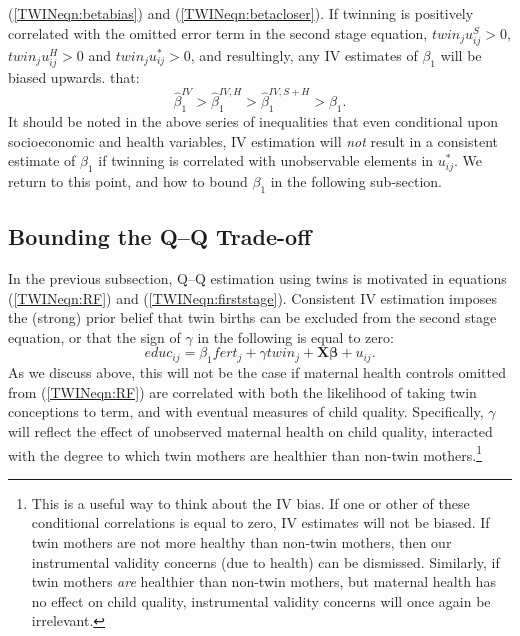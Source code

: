 \documentclass[subeqn]{article}
\begin{document}
\begin{spacing}{1.4}
{(\ref{TWINeqn:betabias}) and (\ref{TWINeqn:betacloser}). If twinning is 
positively correlated with the omitted error term in the second stage equation, 
$twin_ju_{ij}^S>0$, $twin_ju_{ij}^H>0$ and $twin_ju_{ij}^*>0$, and resultingly, 
any IV estimates of $\beta_1$ will be biased upwards.} that:
\begin{equation}
\label{TWINeqn:moves}
\hat\beta_1^{IV}>\hat\beta_1^{IV,H}>\hat\beta_1^{IV,S+H}>\beta_1.
\end{equation}
It should be noted in the above series of inequalities that even conditional upon
socioeconomic and health variables, IV estimation will \emph{not} result in a
consistent estimate of $\beta_1$ if twinning is correlated with unobservable
elements in $u^*_{ij}$.  We return to this point, and how to bound $\beta_1$ in
the following sub-section.

\subsection{Bounding the Q--Q Trade-off}            \label{TWINsscn:methodBounds}
In the previous subsection, Q--Q estimation using twins is motivated in equations 
(\ref{TWINeqn:RF}) and (\ref{TWINeqn:firststage}).  Consistent IV estimation 
imposes the (strong) prior belief that twin births can be excluded from the 
second stage equation, or that the sign of $\gamma$ in the following is equal to 
zero:
\begin{equation}
\label{TWINeqn:Conley}
educ_{ij}=\beta_1 fert_j + \gamma twin_j + \bm{X}\bm{\beta} + u_{ij}.
\end{equation}
As we discuss above, this will not be the case if maternal health controls 
omitted from (\ref{TWINeqn:RF}) are correlated with both the likelihood of 
taking twin conceptions to term, and with eventual measures of child quality.
Specifically, $\gamma$ will reflect the effect of unobserved maternal health on 
child quality, interacted with the degree to which twin mothers are healthier
than non-twin mothers.\footnote{This is a useful way to think about the IV bias.
If one or other of these conditional correlations is equal to zero, IV estimates
will not be biased.  If twin mothers are not more healthy than non-twin mothers,
then our instrumental validity concerns (due to health) can be dismissed.  
Similarly, if twin mothers \emph{are} healthier than non-twin mothers, but 
maternal health has no effect on child quality, instrumental validity concerns 
will once again be irrelevant.}


\end{spacing}
\end{document}
